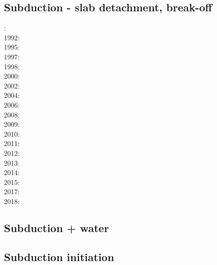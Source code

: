 \subsection*{Subduction - slab detachment, break-off}

: \cite{futo85}\\
1992: \cite{wosp92}\\
1995: \cite{yowo95}\cite{voda95}\\
1997: \cite{wowo97}\\
1998: \cite{desw98}\cite{caws98}\\
2000: \cite{wosp00}\\
2002: \cite{bugw02}\\
2004: \cite{geym04}\\
2006: \cite{fabm06}\\
2008: \cite{zlfd08}\\
2009: \cite{anbi09}\cite{bubi09}\\
2010: \cite{bubi10}\\
2011: \cite{dugm11}\cite{vaal11}\\
2012: \cite{dugk12}\cite{dusg12}\\
2013: \cite{care13}\cite{mafv13}\cite{ghbu13}\\
2014: \cite{dugs14}\cite{besr14}\cite{vosd14}\\
2015: \cite{vosc15}\\
2017: \cite{frbm17}\\
2018: \cite{garm18}

\subsection*{Subduction + water}

\cite{geme11}
\cite{fagm12}
\cite{qubu14}

\subsection*{Subduction initiation}

